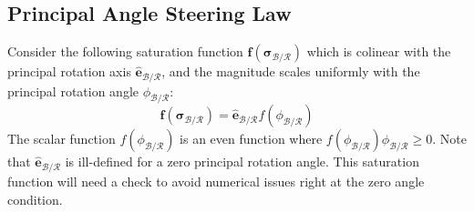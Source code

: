 \documentclass[]{BasiliskReportMemo}
\begin{document}
%




















\subsection{Principal Angle Steering Law}
Consider the following saturation function $\bm f(\bm \sigma_{\mathcal{B}/\mathcal{R}})$ which is colinear with the principal rotation axis  $\hat{\bm e}_{\mathcal{B}/\mathcal{R}}$, and the magnitude scales uniformly with the principal rotation angle $\phi_{\mathcal{B}/\mathcal{R}}$:
\begin{equation}
	\label{eq:MS:16}
	\bm f (\bm \sigma_{\mathcal{B}/\mathcal{R}}) = \hat{\bm e}_{\mathcal{B}/\mathcal{R}} f(\phi_{\mathcal{B}/\mathcal{R}})
\end{equation}
The scalar function $f(\phi_{\mathcal{B}/\mathcal{R}})$ is an even function where $f(\phi_{\mathcal{B}/\mathcal{R}})\phi_{\mathcal{B}/\mathcal{R}} \ge 0$.  Note that $\hat{\bm e}_{\mathcal{B}/\mathcal{R}}$ is ill-defined for a zero principal rotation angle.  This saturation function will need a check to avoid numerical issues right at the zero angle condition.
\end{document}
